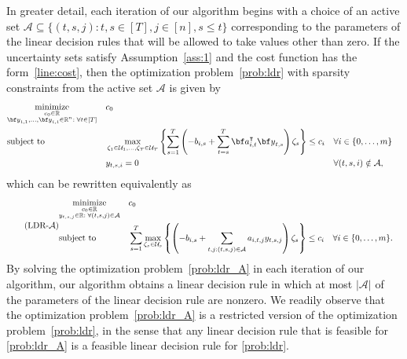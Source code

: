 \documentclass[nonblindrev,mnsc]{informs3} %
\newcommand{\ba}{{\bf a}}
\newcommand{\by}{{\bf y}}
\def\Real{\mathbb{R}}
\let\R\Real
\begin{document}
In greater detail, each iteration of our algorithm begins with a choice of an active set $\mathcal{A} \subseteq \{(t,s,j): t,s \in [T], j \in [n], s \le t \}$ corresponding to the parameters of the linear decision rules that will be allowed to take values other than zero. If the uncertainty sets satisfy Assumption~\ref{ass:1} and the cost function  has the form~\eqref{line:cost},  then the optimization problem~\eqref{prob:ldr} with sparsity constraints from  the active set $\mathcal{A}$  is given by
\begin{equation*} 
\begin{aligned}
&\underset{\substack{c_0 \in \R\\ \by_{t,1},\ldots,\by_{t,t} \in \R^n:\;  \forall t \in [T]}}{\textnormal{minimize}}&& c_0 \\
&\textnormal{subject to}&& \max_{\zeta_1 \in \mathcal{U}_1, \ldots,\zeta_T \in \mathcal{U}_T}  \left \{ \sum_{s=1}^T\left( - b_{i,s} +  \sum_{t=s}^T \ba_{i,t}^\intercal \by_{t,s} \right)  \zeta_s  \right \}  \le c_i  &&\forall i \in \{0,\ldots,m\}\\
&&& y_{t,s,i} = 0 && \forall (t,s,i) \notin \mathcal{A},
\end{aligned}
\end{equation*}
which can be rewritten equivalently as
\begin{equation}  \tag{LDR-$\mathcal{A}$} \label{prob:ldr_A}
\begin{aligned}
&\underset{\substack{c_0 \in \R\\ y_{t,s,j} \in \R :\;  \forall (t,s,j) \in \mathcal{A}}}{\textnormal{minimize}}&& c_0 \\
&\textnormal{subject to}&&   \sum_{s = 1}^T  \max_{\zeta_s \in \mathcal{U}_s } \left \{ \left( - b_{i,s} + \sum_{t,j: (t,s,j) \in \mathcal{A}} a_{i,t,j} y_{t,s,j} \right) \zeta_s \right \}  \le c_i  &&\forall i \in \{0,\ldots,m\}.\end{aligned}
\end{equation}
By solving the optimization problem~\eqref{prob:ldr_A} in each iteration of our algorithm, our algorithm obtains a linear decision rule in which at most $| \mathcal{A}|$ of the parameters of the linear decision rule are nonzero. We readily observe that the optimization problem~\eqref{prob:ldr_A} is a restricted version of the optimization problem~\eqref{prob:ldr}, in the sense that any linear decision rule that is feasible for \eqref{prob:ldr_A} is a feasible linear decision rule for \eqref{prob:ldr}. 
\end{document}
